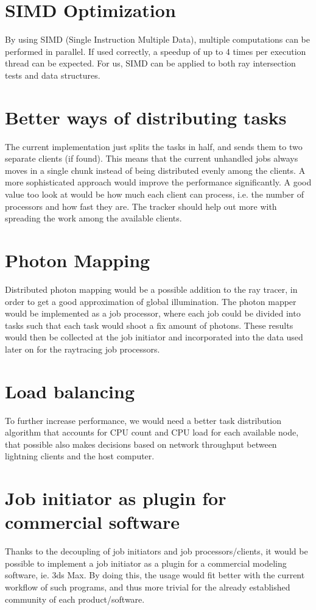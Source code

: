 \section{SIMD Optimization}
By using SIMD (Single Instruction Multiple Data), multiple computations can be performed in parallel. If used correctly, a speedup of up to 4 times per execution thread can be expected. For us, SIMD can be applied to both ray intersection tests and data structures.

\section{Better ways of distributing tasks}
The current implementation just splits the tasks in half, and sends them to two separate clients (if found).
This means that the current unhandled jobs always moves in a single chunk instead of being distributed evenly among the clients.
A more sophisticated approach would improve the performance significantly. A good value too look at would be how much each client can process, i.e. the number of processors and how fast they are.
The tracker should help out more with spreading the work among the available clients.

\section{Photon Mapping}
Distributed photon mapping would be a possible addition to the ray tracer, in order to get a good approximation of global illumination. The photon mapper would be implemented as a job processor, where each job could be divided into tasks such that each task would shoot a fix amount of photons. These results would then be collected at the job initiator and incorporated into the data used later on for the raytracing job processors.

\section{Load balancing}
To further increase performance, we would need a better task distribution algorithm that accounts for CPU count and CPU load for each available node, that possible also makes decisions based on network throughput between lightning clients and the host computer.

\section{Job initiator as plugin for commercial software}
Thanks to the decoupling of job initiators and job processors/clients, it would be possible to implement a job initiator as a plugin for a commercial modeling software, ie. 3ds Max. By doing this, the usage would fit better with the current workflow of such programs, and thus more trivial for the already established community of each product/software.

